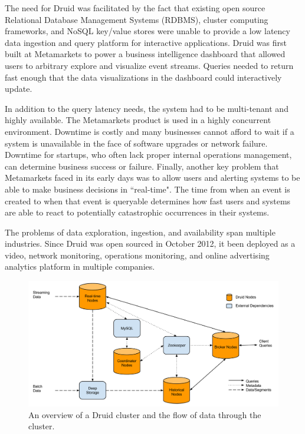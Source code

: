\documentclass{vldb}
\begin{document}
The need for Druid was facilitated by the fact that existing open source
Relational Database Management Systems (RDBMS), cluster computing frameworks,
and NoSQL key/value stores were unable to provide a low latency data ingestion
and query platform for interactive applications.  Druid was first built at
Metamarkets to power a business intelligence dashboard that allowed users to
arbitrary explore and visualize event streams.  Queries needed to return fast
enough that the data visualizations in the dashboard could interactively
update.

In addition to the query latency needs, the system had to be multi-tenant and
highly available. The Metamarkets product is used in a highly concurrent
environment. Downtime is costly and many businesses cannot afford to wait if a
system is unavailable in the face of software upgrades or network failure.
Downtime for startups, who often lack proper internal operations management,
can determine business success or failure. Finally, another key problem that
Metamarkets faced in its early days was to allow users and alerting systems to
be able to make business decisions in ``real-time". The time from when an event
is created to when that event is queryable determines how fast users and
systems are able to react to potentially catastrophic occurrences in their
systems. 

The problems of data exploration, ingestion, and availability span multiple
industries. Since Druid was open sourced in October 2012, it been deployed as a
video, network monitoring, operations monitoring, and online advertising
analytics platform in multiple companies.

\begin{figure}
\centering
\includegraphics[width = 4.5in]{cluster}
\caption{An overview of a Druid cluster and the flow of data through the cluster.}
\label{fig:cluster}
\end{figure}
\end{document}
